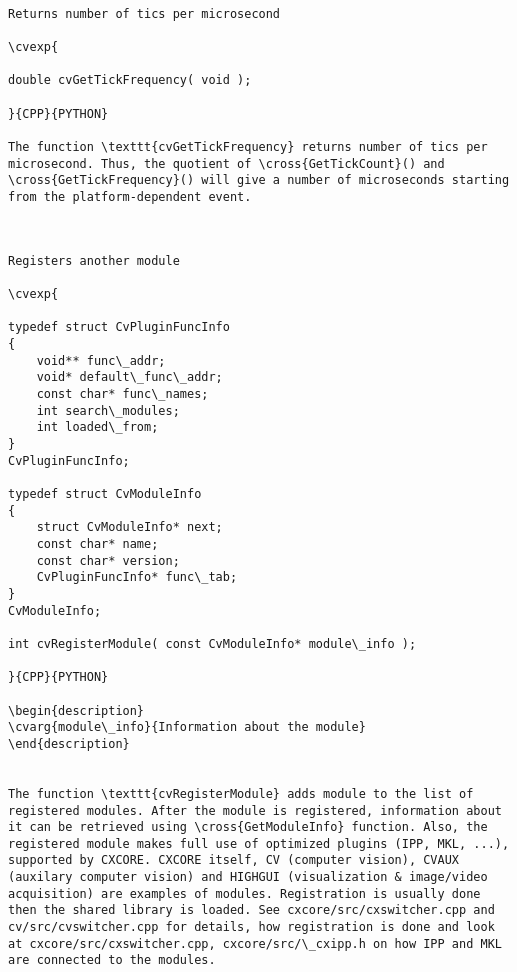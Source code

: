 \begin{verbatim}

Returns number of tics per microsecond

\cvexp{

double cvGetTickFrequency( void );

}{CPP}{PYTHON}

The function \texttt{cvGetTickFrequency} returns number of tics per microsecond. Thus, the quotient of \cross{GetTickCount}() and \cross{GetTickFrequency}() will give a number of microseconds starting from the platform-dependent event.


\end{verbatim}
\begin{verbatim}

Registers another module

\cvexp{

typedef struct CvPluginFuncInfo
{
    void** func\_addr;
    void* default\_func\_addr;
    const char* func\_names;
    int search\_modules;
    int loaded\_from;
}
CvPluginFuncInfo;

typedef struct CvModuleInfo
{
    struct CvModuleInfo* next;
    const char* name;
    const char* version;
    CvPluginFuncInfo* func\_tab;
}
CvModuleInfo;

int cvRegisterModule( const CvModuleInfo* module\_info );

}{CPP}{PYTHON}

\begin{description}
\cvarg{module\_info}{Information about the module}
\end{description}


The function \texttt{cvRegisterModule} adds module to the list of registered modules. After the module is registered, information about it can be retrieved using \cross{GetModuleInfo} function. Also, the registered module makes full use of optimized plugins (IPP, MKL, ...), supported by CXCORE. CXCORE itself, CV (computer vision), CVAUX (auxilary computer vision) and HIGHGUI (visualization & image/video acquisition) are examples of modules. Registration is usually done then the shared library is loaded. See cxcore/src/cxswitcher.cpp and cv/src/cvswitcher.cpp for details, how registration is done and look at cxcore/src/cxswitcher.cpp, cxcore/src/\_cxipp.h on how IPP and MKL are connected to the modules.


\end{verbatim}
